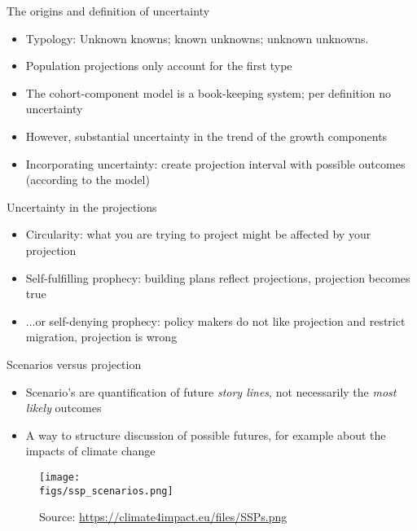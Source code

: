 \documentclass[final, 12pt, aspectratio=169, xcolor={dvipsnames}]{beamer}
\newcommand*{\figs}{../figs}%
\newcommand{\source}[1]{\caption*{\tiny Source: {#1}} }
\begin{document}
\begin{frame}{The origins and definition of uncertainty}
  \begin{itemize}
  \item Typology: Unknown knowns; known unknowns; unknown unknowns.
    \item Population projections only account for the first type
  \item The cohort-component model is a book-keeping system; per definition no uncertainty
  \item However, substantial uncertainty in the trend of the growth components
    \item Incorporating uncertainty: create projection interval with possible outcomes (according to the model) 
    \end{itemize}
\end{frame}

\begin{frame}{Uncertainty in the projections}
  \begin{itemize}
    \item Circularity: what you are trying to project might be affected by your projection
    \item Self-fulfilling prophecy: building plans reflect projections, projection becomes true
    \item ...or self-denying prophecy: policy makers do not like projection and restrict migration, projection is wrong
    \end{itemize}
\end{frame}

\begin{frame}{Scenarios versus projection}
  \begin{minipage}[t]{0.48\linewidth}%
    \begin{itemize}
    \item Scenario's are quantification of future \textit{story lines}, not necessarily the \textit{most likely} outcomes
    \item A way to structure discussion of possible futures, for example about the impacts of climate change
    \end{itemize}   
\end{minipage}%
\hfill%
\begin{minipage}[t]{0.48\linewidth}
  \vspace{-1cm}
  \centering
  \begin{figure}
    \texttt{[image: \\figs/ssp\_scenarios.png]}
    \source{\url{https://climate4impact.eu/files/SSPs.png}}
    \end{figure}
\end{minipage}

\end{frame}
\end{document}
